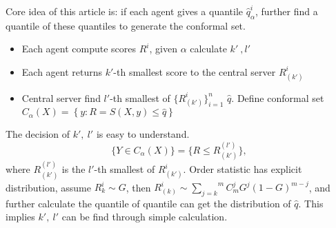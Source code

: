 \documentclass[12pt, a4paper, oneside]{article}
\begin{document}
    Core idea of this article is: if each agent gives a quantile $\hat{q}_\alpha^i$, further find a quantile of these quantiles to generate the conformal set.
    \begin{itemize}
        \item Each agent compute scores $R^i$, given $\alpha$ calculate $k'\ ,l'$
        \item Each agent returns $k'$-th smallest score to the central server $R_{(k')}^i$
        \item Central server find $l'$-th smallest of $\{R_{(k')}^i\}_{i=1}^n$ $\hat{q}$. Define conformal set $C_\alpha(X)=\left\{ y:R=S(X,y)\leq\hat{q} \right\}$
    \end{itemize}


    The decision of $k',\ l'$ is easy to understand. 
    \begin{equation*}
        \{Y\in C_\alpha(X)\}=\{R\leq R_{(k')}^{(l')}\},
    \end{equation*}
    where $R_{(k')}^{(l')}$ is the $l'$-th smallest of $R_{(k')}^i$. Order statistic has explicit distribution, assume $R_k^i\sim G$, then $R_{(k)}^i\sim \overset{m}{\underset{j=k}\sum}C_m^jG^j(1-G)^{m-j}$, and further calculate the quantile of quantile can get the distribution of $\hat{q}$. This implies $k',\ l'$ can be find through simple calculation.
\newpage


\end{document}
